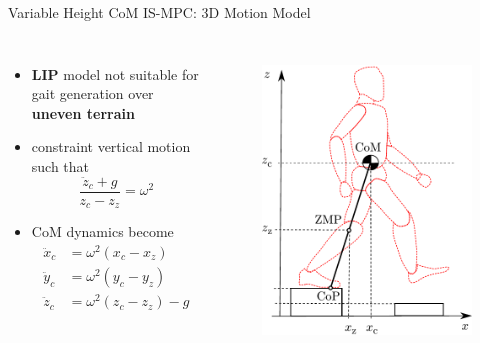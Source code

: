 \documentclass[10pt]{beamer}
\begin{document}
\begin{frame}{Variable Height CoM IS-MPC: 3D Motion Model}
  \begin{columns}[c,onlytextwidth]
      \begin{itemize}
        \item \textbf{LIP} model not suitable for gait generation over
						\textbf{uneven terrain}
				\item constraint vertical motion such that
			    \begin{equation*}
            \frac{\ddot{z}_c + g}{z_c - z_z} = \omega^2
          \end{equation*}
				\item CoM dynamics become
				  \begin{align*}
					  \ddot{x}_c &= \omega^2 (x_c - x_z)\\
					  \ddot{y}_c &= \omega^2 (y_c - y_z)\\
					  \ddot{z}_c &= \omega^2 (z_c - z_z) - g
				  \end{align*}
			\end{itemize}
		  \begin{figure}
        \centering
        \includegraphics[width=\textwidth]{figures/LIPM_robot.pdf}
        \label{fig:lipm-robot}
    \end{figure}
	\end{columns}
\end{frame}
\end{document}
